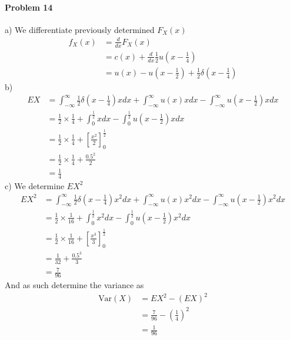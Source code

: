 \paragraph{Problem 14}
a)
We differentiate previously determined $F_{X}(x)$
\begin{align*}
    f_{X}(x)&=\frac{d}{dx}F_{X}(x) \\
            &=c(x)+\frac{d}{dx}\frac{1}{2}u\left(x-\frac{1}{4}\right) \\
            &=u(x)-u\left(x-\frac{1}{2}\right)+\frac{1}{2}\delta\left(x-\frac{1}{4}\right)
\end{align*}
b)
\begin{align*}
    EX&=\int_{-\infty}^{\infty}\frac{1}{2}\delta\left(x-\frac{1}{4}\right)xdx+\int_{-\infty}^{\infty}u(x)xdx-\int_{-\infty}^{\infty}u\left(x-\frac{1}{2}\right)xdx \\
      &=\frac{1}{2}\times\frac{1}{4}+\int_{0}^{\frac{1}{2}}xdx-\int_{0}^{\frac{1}{2}}u\left(x-\frac{1}{2}\right)xdx \\
      &=\frac{1}{2}\times\frac{1}{4}+\left[\frac{x^{2}}{2}\right]_{0}^{\frac{1}{2}} \\
      &=\frac{1}{2}\times\frac{1}{4}+\frac{0.5^{2}}{2} \\
      &=\frac{1}{4}
\end{align*}
c)
We determine $EX^{2}$
\begin{align*}
    EX^{2}&=\int_{-\infty}^{\infty}\frac{1}{2}\delta\left(x-\frac{1}{4}\right)x^{2}dx+\int_{-\infty}^{\infty}u(x)x^{2}dx-\int_{-\infty}^{\infty}u\left(x-\frac{1}{2}\right)x^{2}dx \\
       &=\frac{1}{2}\times\frac{1}{16}+\int_{0}^{\frac{1}{2}}x^{2}dx-\int_{0}^{\frac{1}{2}}u\left(x-\frac{1}{2}\right)x^{2}dx \\
       &=\frac{1}{2}\times\frac{1}{16}+\left[\frac{x^{3}}{3}\right]_{0}^{\frac{1}{2}} \\
       &=\frac{1}{32}+\frac{0.5^{3}}{3} \\
       &=\frac{7}{96}
\end{align*}
And as such determine the variance as
\begin{align*}
    \text{Var}(X)&=EX^{2}-(EX)^{2} \\
             &=\frac{7}{96}-\left(\frac{1}{4}\right)^{2} \\
             &=\frac{1}{96}
\end{align*}
